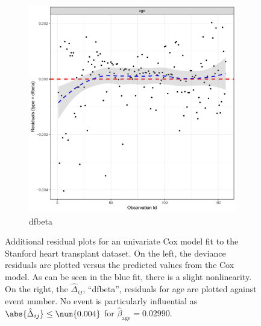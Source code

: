 \begin{figure}[H]
\begin{subfigure}[c]{0.48\textwidth}
  \includegraphics[width=\textwidth]{figures/survival/stanford_cox_age_dfbeta}
  \caption{dfbeta}
  \label{fig:cox:outliers:dfbeta}
  \end{subfigure}
\caption{
Additional residual plots for
an univariate Cox model fit to the Stanford heart transplant dataset.
On the left, the deviance residuals are plotted versus the predicted values from the Cox model.
As can be seen in the blue fit, there is a slight nonlinearity.
On the right, the $\hat{\Delta}_{ij}$, \ie ``dfbeta'', residuals for age
are plotted against event number.
No event is particularly influential as $\abs{\hat{\Delta}_{ij}} \leq \num{0.004}$
for $\hat{\beta}_{\text{age}} = \num{0.02990}$.
}
\label{fig:cox:outliers}
\end{figure}
